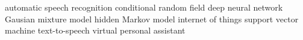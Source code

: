 


 {automatic speech recognition}
 {conditional random field}
 {deep neural network}
 {Gausian mixture model}
 {hidden Markov model}
 {internet of things}
 {support vector machine}
 {text-to-speech}
 {virtual personal assistant}



